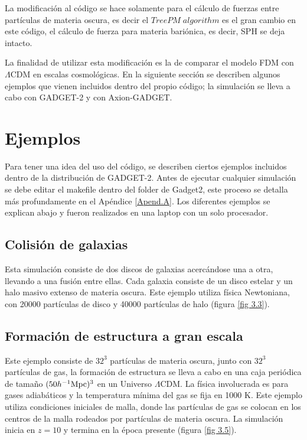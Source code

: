 \documentclass[a4paper,openright,12pt]{book}
\begin{document}
La modificación al código se hace solamente para el cálculo de fuerzas entre partículas de materia oscura, es decir el $TreePM\;algorithm$ es el gran cambio en este código, el cálculo de fuerza para materia bariónica, es decir, SPH se deja intacto.

La finalidad de utilizar esta modificación es la de comparar el modelo FDM con $\Lambda$CDM en escalas cosmológicas. En la siguiente sección se describen algunos ejemplos que vienen incluidos dentro del propio código; la simulación se lleva a cabo con GADGET-2 y con Axion-GADGET.

\section{Ejemplos}
Para tener una idea del uso del código, se describen ciertos ejemplos incluidos dentro de la distribución de GADGET-2. Antes de ejecutar cualquier simulación se debe editar el \textsf{makefile} dentro del folder de \textsf{Gadget2}, este proceso se detalla más profundamente en el Apéndice \ref{Apend.A}. Los diferentes ejemplos se explican abajo y fueron realizados en una laptop con un solo procesador.

\subsection{Colisión de galaxias}
Esta simulación consiste de dos discos de galaxias acercándose una a otra, llevando a una fusión entre ellas. Cada galaxia consiste de un disco estelar y un halo masivo extenso de materia oscura. Este ejemplo utiliza física Newtoniana, con 20000 partículas de disco y 40000 partículas de halo (figura \ref{fig 3.3}). 

\subsection{Formación de estructura a gran escala}
Este ejemplo consiste de $32^{3}$ partículas de materia oscura, junto con $32^{3}$ partículas de gas, la formación de estructura se lleva a cabo en una caja periódica de tamaño $(50 h^{-1} \textup{Mpc})^{3}$ en un Universo $\Lambda$CDM. La física involucrada es para gases adiabáticos y la temperatura mínima del gas se fija en 1000 K. Este ejemplo utiliza condiciones iniciales de malla, donde las partículas de gas se colocan en los centros de la malla rodeados por partículas de materia oscura. La simulación inicia en $z = 10$ y termina en la época presente (figura \ref{fig 3.5}).
\end{document}
